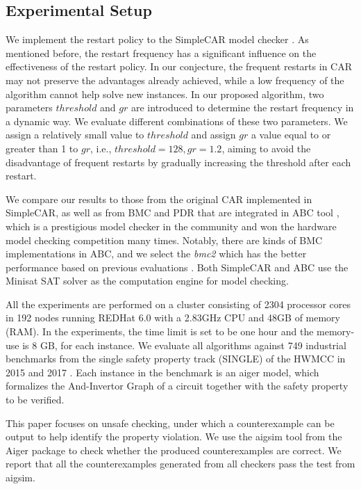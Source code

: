 \subsection{Experimental Setup}
We implement the restart policy to the SimpleCAR model checker \cite{simplecar}. As mentioned before, the restart frequency has a significant influence on the effectiveness of the restart policy. In our conjecture, the frequent restarts in CAR may not preserve the advantages already achieved, while a low frequency of the algorithm cannot help solve new instances. In our proposed algorithm, two parameters $threshold$ and $gr$ are introduced to determine the restart frequency in a dynamic way. We evaluate different combinations of these two parameters. We assign a relatively small value to $threshold$ and assign $gr$ a value equal to or greater than 1 to $gr$, i.e., $threshold = 128, gr = 1.2$, aiming to avoid the disadvantage of frequent restarts by gradually increasing the threshold after each restart. 

We compare our results to those from the original CAR implemented in SimpleCAR, as well as from BMC and PDR that are integrated in ABC tool \cite{BM10}, which is a prestigious model checker in the community and won the hardware model checking competition many times. Notably, there are kinds of BMC implementations in ABC, and we select the \emph{bmc2} which has the better performance based on previous evaluations \cite{LDPRV18}. Both SimpleCAR and ABC use the Minisat SAT solver \cite{minisat,ES04} as the computation engine for model checking. 

All the experiments are performed on a cluster consisting of 2304 processor cores in 192 nodes running REDHat 6.0 with a 2.83GHz CPU and 48GB of memory (RAM). In the experiments, the time limit is set to be one hour and the memory-use is 8 GB, for each instance.
We evaluate all algorithms against 749 industrial benchmarks from the single safety property track (SINGLE) of the HWMCC in 2015 \cite{hwmcc15} and 2017 \cite{hwmcc17}. Each instance in the benchmark is an aiger model, which formalizes the And-Invertor Graph \cite{aiger} of a circuit together with the safety property to be verified. 

This paper focuses on unsafe checking, under which a counterexample can be output to help identify the property violation. We use the aigsim tool from the Aiger package \cite{aigertools} to check whether the produced counterexamples are correct. We report that all the counterexamples generated from all checkers pass the test from aigsim.

